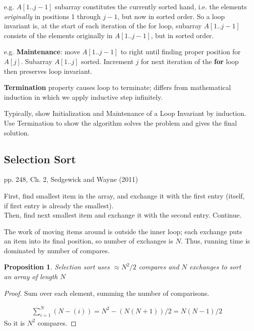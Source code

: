\documentclass[10pt]{amsart}
\newtheorem{proposition}{Proposition}
\begin{document}
\begin{multicols*}{2}
e.g. $A[1.. j-1]$ subarray constitutes the currently sorted hand, i.e. the elements \emph{originally} in positions 1 through $j-1$, but now in sorted order. So a loop invariant is, at the start of each iteration of the for loop, subarray $A[1.. j-1]$ consists of the elements originally in $A[1..j-1]$, but in sorted order.

e.g. \textbf{Maintenance}: move $A[1..j-1]$ to right until finding proper position for $A[j]$. Subarray $A[1..j]$ sorted. Increment $j$ for next iteration of the \textbf{for} loop then preserves loop invariant.

\textbf{Termination} property causes loop to terminate; differs from mathematical induction in which we apply inductive step infinitely.

Typically, show Initialization and Maintenance of a Loop Invariant by induction. Use Termination to show the algorithm solves the problem and gives the final solution.

\subsection{Selection Sort}

pp. 248, Ch. 2, Sedgewick and Wayne (2011) \cite{SeWa2011}

First, find smallest item in the array, and exchange it with the first entry (itself, if first entry is already the smallest). \\
Then, find next smallest item and exchange it with the second entry. Continue.

The work of moving items around is outside the inner loop; each exchange puts an item into its final position, so number of exchanges is $N$. Thus, running time is dominated by number of compares.

\begin{proposition}
	Selection sort uses $ \approx N^2 /2 $ compares and $N$ exchanges to sort an array of length $N$
\end{proposition}

\begin{proof}

Sum over each element, summing the number of comparisons.

\[
\begin{gathered}
	\sum_{i=1}^{N} (N - (i)) = N^2 - (N (N + 1) ) / 2 = N (N - 1) / 2
\end{gathered}
\]
So it is $N^2$ compares.

\end{proof}


\end{multicols*}
\end{document}
